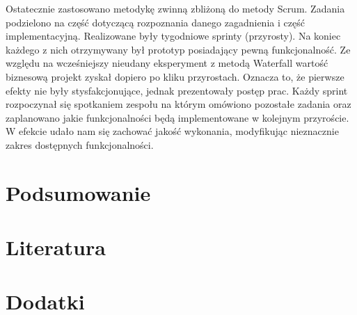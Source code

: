 \documentclass[10pt,a4paper,onecolumn]{article}
\begin{document}
Ostatecznie zastosowano metodykę zwinną zbliżoną do metody Scrum. Zadania podzielono na część dotyczącą rozpoznania danego zagadnienia i część implementacyjną. Realizowane były tygodniowe sprinty (przyrosty). Na koniec każdego z nich otrzymywany był prototyp posiadający pewną funkcjonalność. Ze względu na wcześniejszy nieudany eksperyment z metodą Waterfall wartość biznesową projekt zyskał dopiero po kliku przyrostach. Oznacza to, że pierwsze efekty nie były stysfakcjonujące, jednak prezentowały postęp prac. Każdy sprint rozpoczynał się spotkaniem zespołu na którym omówiono pozostałe zadania oraz zaplanowano jakie funkcjonalności będą implementowane w kolejnym przyroście. W efekcie udało nam się zachować jakość wykonania, modyfikując nieznacznie zakres dostępnych funkcjonalności.

\section{Podsumowanie}

\section{Literatura}

\section{Dodatki}
\end{document}
